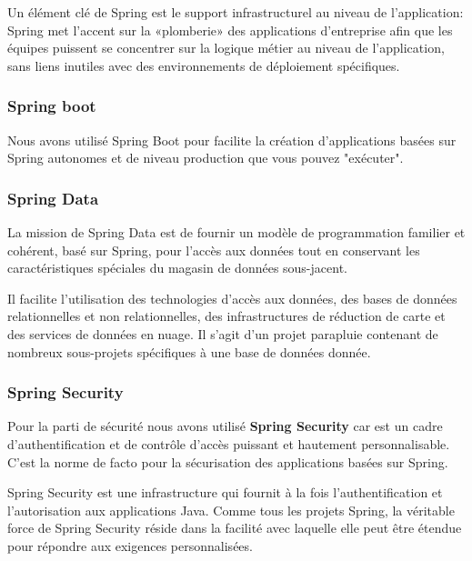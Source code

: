  
  Un élément clé de Spring est le support infrastructurel au niveau de l’application: Spring met l’accent sur la «plomberie» des applications d’entreprise afin que les équipes puissent se concentrer sur la logique métier au niveau de l’application, sans liens inutiles avec des environnements de déploiement spécifiques.
  
 \subsubsection{Spring boot}
Nous avons utilisé Spring Boot pour  facilite la création d'applications basées sur Spring autonomes et de niveau production que vous pouvez "exécuter".
 
  
   \subsubsection{Spring Data}
   La mission de Spring Data est de fournir un modèle de programmation familier et cohérent, basé sur Spring, pour l’accès aux données tout en conservant les caractéristiques spéciales du magasin de données sous-jacent.
   
   Il facilite l'utilisation des technologies d'accès aux données, des bases de données relationnelles et non relationnelles, des infrastructures de réduction de carte et des services de données en nuage. Il s'agit d'un projet parapluie contenant de nombreux sous-projets spécifiques à une base de données donnée.
   
   \subsubsection{Spring Security}
  Pour la parti de sécurité  nous avons utilisé  \textbf{Spring Security} car  est un cadre d’authentification et de contrôle d’accès puissant et hautement personnalisable. C'est la norme de facto pour la sécurisation des applications basées sur Spring.
   
   Spring Security est une infrastructure qui fournit à la fois l’authentification et l’autorisation aux applications Java. Comme tous les projets Spring, la véritable force de Spring Security réside dans la facilité avec laquelle elle peut être étendue pour répondre aux exigences personnalisées.
